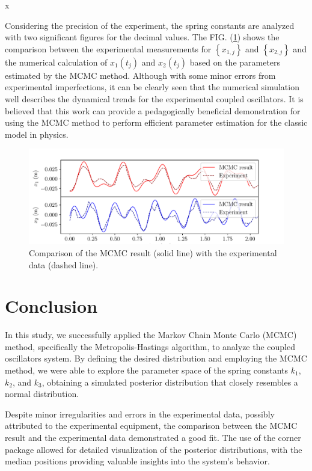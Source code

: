 x\documentclass[12pt, a4paper, reprint, nofootinbib, twoside,  showkeys]{revtex4-1}
\begin{document}
Considering the precision of the experiment, the spring constants are analyzed with two significant figures for the decimal values. The FIG. (\ref{fig:position_compare}) shows the comparison between the experimental measurements for $\left\{x_{1,j}\right\}$ and $\left\{x_{2,j}\right\}$ and the numerical calculation of $x_1\left(t_j\right)$ and $x_2\left(t_j\right)$ based on the parameters estimated by the MCMC method. Although with some minor errors from experimental imperfections, it can be clearly seen that the numerical simulation well describes the dynamical trends for the experimental coupled oscillators. It is believed that this work can provide a pedagogically beneficial demonstration for using the MCMC method to perform efficient parameter estimation for the classic model in physics.
\begin{figure}[h]
\centering
\includegraphics[width=\linewidth]{image/position_compare.pdf}
\caption{Comparison of the MCMC result (solid line) with the experimental data (dashed line).}
\label{fig:position_compare}
\end{figure}

\section{Conclusion}
In this study, we successfully applied the Markov Chain Monte Carlo (MCMC) method, specifically the Metropolis-Hastings algorithm, to analyze the coupled oscillators system. By defining the desired distribution and employing the MCMC method, we were able to explore the parameter space of the spring constants $k_1$, $k_2$, and $k_3$, obtaining a simulated posterior distribution that closely resembles a normal distribution.

Despite minor irregularities and errors in the experimental data, possibly attributed to the experimental equipment, the comparison between the MCMC result and the experimental data demonstrated a good fit. The use of the corner package allowed for detailed visualization of the posterior distributions, with the median positions providing valuable insights into the system's behavior.
\end{document}
